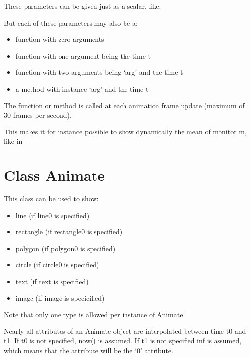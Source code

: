 \documentclass[letterpaper,10pt,english]{sphinxmanual}
\begin{document}
These parameters can be given just as a scalar, like:


But each of these parameters may also be a:
\begin{itemize}
\item {} 
function with zero arguments

\item {} 
function with one argument being the time t

\item {} 
function with two arguments being ‘arg’ and the time t

\item {} 
a method with instance ‘arg’ and the time t

\end{itemize}

The function or method is called at each animation frame update (maximum of 30 frames per second).

This makes it for instance possible to show dynamically the mean of monitor m, like in



\section{Class Animate}
\label{\detokenize{Animation:class-animate}}
This class can be used to show:
\begin{itemize}
\item {} 
line (if line0 is specified)

\item {} 
rectangle (if rectangle0 is specified)

\item {} 
polygon (if polygon0 is specified)

\item {} 
circle (if circle0 is specified)

\item {} 
text (if text is specified)

\item {} 
image (if image is specicified)

\end{itemize}

Note that only one type is allowed per instance of Animate.

Nearly all attributes of an Animate object are interpolated between time t0 and t1.
If t0 is not specified, now() is assumed.
If t1 is not specified inf is assumed, which means that the attribute will be the ‘0’ attribute.
\end{document}
